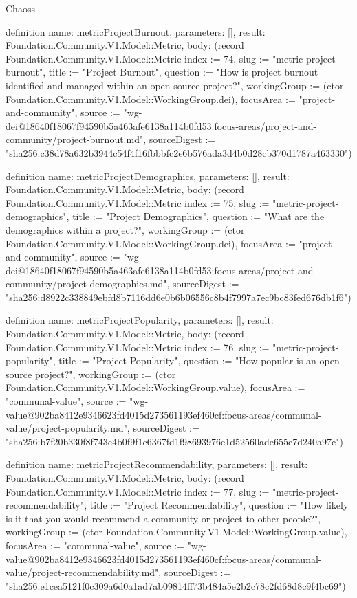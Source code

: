 \begin{lexlean}{Chaoss}
\begin{semanticmodule}
definition{
  name: metricProjectBurnout,
  parameters: [],
  result: Foundation.Community.V1.Model::Metric,
  body: (record Foundation.Community.V1.Model::Metric {index := 74, slug := "metric-project-burnout", title := "Project Burnout", question := "How is project burnout identified and managed within an open source project?", workingGroup := (ctor Foundation.Community.V1.Model::WorkingGroup.dei), focusArea := "project-and-community", source := "wg-dei@18640f18067f94590b5a463afe6138a114b0fd53:focus-areas/project-and-community/project-burnout.md", sourceDigest := "sha256:c38d78a632b3944c54f4f16fbbbfc2e6b576ada3d4b0d28cb370d1787a463330"})
}

definition{
  name: metricProjectDemographics,
  parameters: [],
  result: Foundation.Community.V1.Model::Metric,
  body: (record Foundation.Community.V1.Model::Metric {index := 75, slug := "metric-project-demographics", title := "Project Demographics", question := "What are the demographics within a project?", workingGroup := (ctor Foundation.Community.V1.Model::WorkingGroup.dei), focusArea := "project-and-community", source := "wg-dei@18640f18067f94590b5a463afe6138a114b0fd53:focus-areas/project-and-community/project-demographics.md", sourceDigest := "sha256:d8922c338849ebfd8b7116dd6e0b6b06556c8b4f7997a7ec9bc83fed676db1f6"})
}

definition{
  name: metricProjectPopularity,
  parameters: [],
  result: Foundation.Community.V1.Model::Metric,
  body: (record Foundation.Community.V1.Model::Metric {index := 76, slug := "metric-project-popularity", title := "Project Popularity", question := "How popular is an open source project?", workingGroup := (ctor Foundation.Community.V1.Model::WorkingGroup.value), focusArea := "communal-value", source := "wg-value@902ba8412e9346623fd4015d273561193ef460cf:focus-areas/communal-value/project-popularity.md", sourceDigest := "sha256:b7f20b330f8f743c4b0f9f1c6367fd1f98693976e1d52560ade655e7d240a97c"})
}

definition{
  name: metricProjectRecommendability,
  parameters: [],
  result: Foundation.Community.V1.Model::Metric,
  body: (record Foundation.Community.V1.Model::Metric {index := 77, slug := "metric-project-recommendability", title := "Project Recommendability", question := "How likely is it that you would recommend a community or project to other people?", workingGroup := (ctor Foundation.Community.V1.Model::WorkingGroup.value), focusArea := "communal-value", source := "wg-value@902ba8412e9346623fd4015d273561193ef460cf:focus-areas/communal-value/project-recommendability.md", sourceDigest := "sha256:e1cea5121f0c309a6d0a1ad7ab09814ff73b484a5e2b2c78c2fd68d8c9f4bc69"})
}


\end{semanticmodule}
\end{lexlean}

